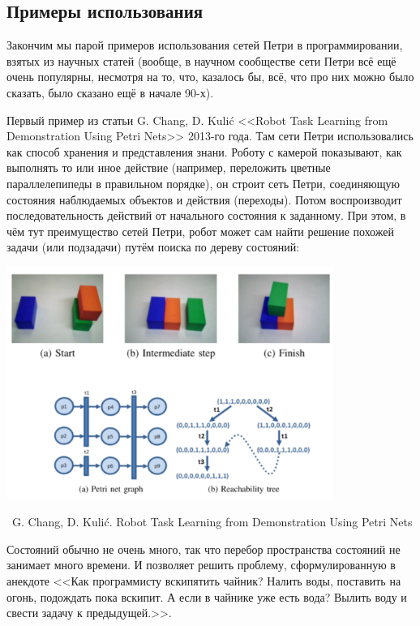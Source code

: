 \documentclass[a5paper]{article}
\newcommand{\attribution}[1] {
	\vspace{-5mm}\begin{flushright}\begin{scriptsize}%
	{\textcopyright\, #1}\end{scriptsize}\end{flushright}
}
\begin{document}
\subsection{Примеры использования}

Закончим мы парой примеров использования сетей Петри в программировании, взятых из научных статей (вообще, в научном сообществе сети Петри всё ещё очень популярны, несмотря на то, что, казалось бы, всё, что про них можно было сказать, было сказано ещё в начале 90-х). 

Первый пример из статьи G. Chang, D. Kulić <<Robot Task Learning from Demonstration Using Petri Nets>> 2013-го года. Там сети Петри использовались как способ хранения и представления знани. Роботу с камерой показывают, как выполнять то или иное действие (например, переложить цветные параллелепипеды в правильном порядке), он строит сеть Петри, соединяющую состояния наблюдаемых объектов и действия (переходы). Потом воспроизводит последовательность действий от начального состояния к заданному. При этом, в чём тут преимущество сетей Петри, робот может сам найти решение похожей задачи (или подзадачи) путём поиска по дереву состояний:

\begin{center}
	\includegraphics[width=0.8\textwidth]{petriUsageExample1.png}
	\attribution{G. Chang, D. Kulić. Robot Task Learning from Demonstration Using Petri Nets}
\end{center}

Состояний обычно не очень много, так что перебор пространства состояний не занимает много времени. И позволяет решить проблему, сформулированную в анекдоте <<Как программисту вскипятить чайник? Налить воды, поставить на огонь, подождать пока вскипит. А если в чайнике уже есть вода? Вылить воду и свести задачу к предыдущей.>>.
\end{document}
